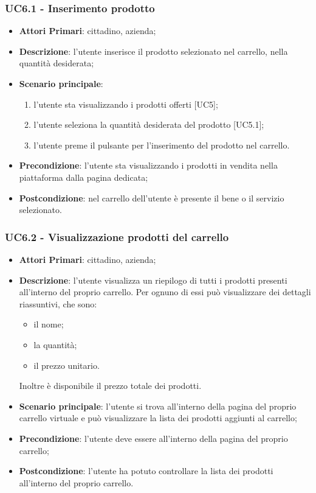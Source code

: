  \subsubsection{UC6.1 - Inserimento prodotto}
\begin{itemize}
	\item \textbf{Attori Primari}: cittadino, azienda;
	\item \textbf{Descrizione}: l'utente inserisce il prodotto selezionato nel carrello, nella quantità desiderata;
	\item \textbf{Scenario principale}:
	\begin{enumerate}[label=\alph*.]
		\item l'utente sta visualizzando i prodotti offerti [UC5];
		\item l'utente seleziona la quantità desiderata del prodotto [UC5.1];
		\item l'utente preme il pulsante per l'inserimento del prodotto nel carrello.
	\end{enumerate}
	\item \textbf{Precondizione}: l'utente sta visualizzando i prodotti in vendita nella piattaforma dalla pagina dedicata;
	\item \textbf{Postcondizione}: nel carrello dell'utente è presente il bene o il servizio selezionato.
\end{itemize}
\subsubsection{UC6.2 - Visualizzazione prodotti del carrello}
\begin{itemize}
	\item \textbf{Attori Primari}: cittadino, azienda;
	\item \textbf{Descrizione}: l'utente visualizza un riepilogo di tutti i prodotti presenti all'interno del proprio carrello. Per ognuno di essi può visualizzare dei dettagli riassuntivi, che sono:
	\begin{itemize}
		\item il nome;
		\item la quantità;
		\item il prezzo unitario.
	\end{itemize}
	Inoltre è disponibile il prezzo totale dei prodotti.

	\item \textbf{Scenario principale}: l'utente si trova all'interno della pagina del proprio carrello virtuale e può visualizzare la lista dei prodotti aggiunti al carrello;
	\item \textbf{Precondizione}: l'utente deve essere all'interno della pagina del proprio carrello;
	\item \textbf{Postcondizione}: l'utente ha potuto controllare la lista dei prodotti all'interno del proprio carrello.
\end{itemize}

